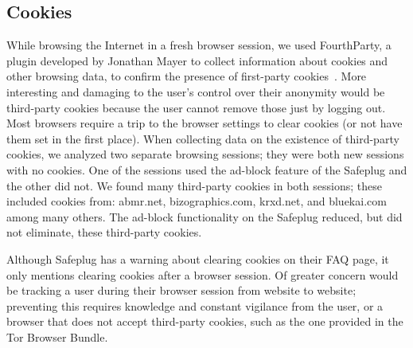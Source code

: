 \documentclass[letterpaper,twocolumn,10pt]{article}
\begin{document}

\subsection{Cookies}  
While browsing the Internet in a fresh browser session, we used FourthParty, a plugin developed by Jonathan Mayer to collect information about cookies and other browsing data, to confirm the presence of first-party cookies~\cite{fourthparty}.  More interesting and damaging to the user's control over their anonymity would be third-party cookies because the user cannot remove those just by logging out.  Most browsers require a trip to the browser settings to clear cookies (or not have them set in the first place).  When collecting data on the existence of third-party cookies, we analyzed two separate browsing sessions; they were both new sessions with no cookies.  One of the sessions used the ad-block feature of the Safeplug and the other did not.  We found many third-party cookies in both sessions; these included cookies from: abmr.net, bizographics.com, krxd.net, and bluekai.com among many others.  The ad-block functionality on the Safeplug reduced, but did not eliminate, these third-party cookies.

Although Safeplug has a warning about clearing cookies on their FAQ page, it only mentions clearing cookies after a browser session.  Of greater concern would be tracking a user during their browser session from website to website; preventing this requires knowledge and constant vigilance from the user, or a browser that does not accept third-party cookies, such as the one provided in the Tor Browser Bundle.
\end{document}
